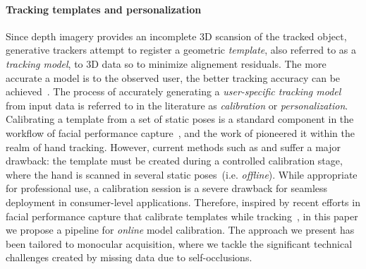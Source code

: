 \paragraph{Tracking templates and personalization}
Since depth imagery provides an incomplete 3D scansion of the tracked object, generative trackers attempt to register a geometric \emph{template}, also referred to as a \emph{tracking model}, to 3D data so to minimize alignement residuals.
The more accurate a model is to the observed user, the better tracking accuracy can be achieved~\cite{tkach2016sphere,taylor2016joint}. The process of accurately generating a \emph{user-specific tracking model} from input data is referred to in the literature as \emph{calibration} or \emph{personalization}. 
Calibrating a template from a set of static poses is a standard component in the workflow of facial performance capture~\cite{weise2011realtime,cao2015facial}, and the work of  \cite{taylor2014user} pioneered it within the realm of hand tracking. However, current methods such as \cite{taylor2016joint} and \cite{tkach2016sphere} suffer a major drawback: the template must be created during a controlled calibration stage, where the hand is scanned in several static poses~(i.e. \emph{offline}). While appropriate for professional use, a calibration session is a severe drawback for seamless deployment in consumer-level applications.
Therefore, inspired by recent efforts in facial performance capture that calibrate templates while tracking~\cite{li_sig13,bouaziz2013online}, in this paper we propose a pipeline for \emph{online} model calibration. 
The approach we present has been tailored to monocular acquisition, where we tackle the significant technical challenges created by missing data due to self-occlusions.

